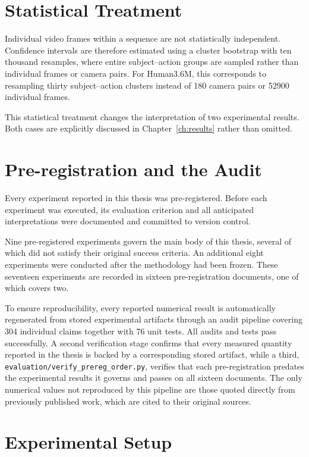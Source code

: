 \documentclass[12pt,a4paper]{report}
\begin{document}
\section{Statistical Treatment}

Individual video frames within a sequence are not statistically independent. Confidence intervals are therefore estimated using a cluster bootstrap with ten thousand resamples, where entire subject--action groups are sampled rather than individual frames or camera pairs. For Human3.6M, this corresponds to resampling thirty subject--action clusters instead of 180 camera pairs or 52900 individual frames.

This statistical treatment changes the interpretation of two experimental results. Both cases are explicitly discussed in Chapter~\ref{ch:results} rather than omitted.

\section{Pre-registration and the Audit}

Every experiment reported in this thesis was pre-registered. Before each experiment was executed, its evaluation criterion and all anticipated interpretations were documented and committed to version control.

Nine pre-registered experiments govern the main body of this thesis, several of which did not satisfy their original success criteria. An additional eight experiments were conducted after the methodology had been frozen. These seventeen experiments are recorded in sixteen pre-registration documents, one of which covers two.

To ensure reproducibility, every reported numerical result is automatically regenerated from stored experimental artifacts through an audit pipeline covering 304 individual claims together with 76 unit tests. All audits and tests pass successfully. A second verification stage confirms that every measured quantity reported in the thesis is backed by a corresponding stored artifact, while a third, \texttt{evaluation/verify\_prereg\_order.py}, verifies that each pre-registration predates the experimental results it governs and passes on all sixteen documents. The only numerical values not reproduced by this pipeline are those quoted directly from previously published work, which are cited to their original sources.

\section{Experimental Setup}
\label{sec:setup}
\end{document}
